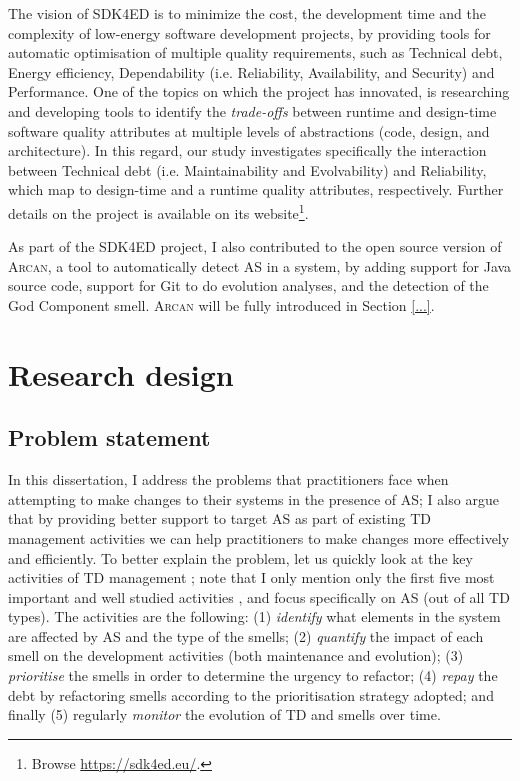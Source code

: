 The vision of SDK4ED is to minimize the cost, the development time and the complexity of low-energy software development projects, by providing tools for automatic optimisation of multiple quality requirements, such as Technical debt, Energy efficiency, Dependability (i.e. Reliability, Availability, and Security) and Performance. 
One of the topics on which the project has innovated, is researching and developing tools to identify the \textit{trade-offs} between runtime and design-time software quality attributes at multiple levels of abstractions (code, design, and architecture).
In this regard, our study investigates specifically the interaction between Technical debt (i.e. Maintainability and Evolvability) and Reliability, which map to design-time and a runtime quality attributes, respectively. Further details on the project is available on its website\footnote{Browse \url{https://sdk4ed.eu/}.}.

As part of the SDK4ED project, I also contributed to the open source version of \textsc{Arcan}, a tool to automatically detect AS in a system, by adding support for Java source code, support for Git to do evolution analyses, and the detection of the God Component smell.
\textsc{Arcan} will be fully introduced in Section \ref{...}.

\section{Research design}\label{sec:intro:research-design}
\subsection{Problem statement}\label{sec:intro:problem-statement}
In this dissertation, I address the problems that practitioners face when attempting to make changes to their systems in the presence of AS; I also argue that by providing better support to target AS as part of existing TD management activities we can help practitioners to make changes more effectively and efficiently. 
To better explain the problem, let us quickly look at the key activities of TD management \cite{Li2015}; note that I only mention only the first five most important and well studied activities \cite{Li2015}, and focus specifically on AS (out of all TD types).
The activities are the following: (1) \emph{identify} what elements in the system are affected by AS and the type of the smells; (2) \emph{quantify} the impact of each smell on the development activities (both maintenance and evolution); (3) \emph{prioritise} the smells in order to determine the urgency to refactor; (4) \emph{repay} the debt by refactoring smells according to the prioritisation strategy adopted; and finally (5) regularly \emph{monitor} the evolution of TD and smells over time.

